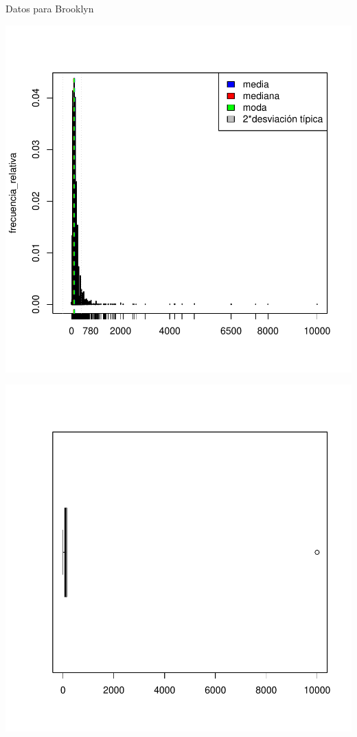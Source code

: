 \documentclass [a4paper] {article}
\begin{document}
Datos para Brooklyn
\begin{center}
\includegraphics{entrega-039}
\end{center}
\begin{center}
\includegraphics{entrega-040}
\end{center}
\end{document}
